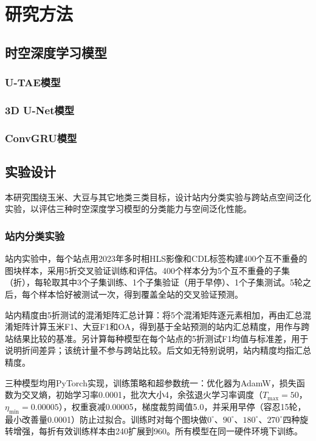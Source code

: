 
\section{研究方法}

\subsection{时空深度学习模型}

\subsubsection{U-TAE模型}


\subsubsection{3D U-Net模型}


\subsubsection{ConvGRU模型}


\subsection{实验设计}

本研究围绕玉米、大豆与其它地类三类目标，设计站内分类实验与跨站点空间泛化实验，以评估三种时空深度学习模型的分类能力与空间泛化性能。

\subsubsection{站内分类实验}

站内实验中，每个站点用2023年多时相HLS影像和CDL标签构建400个互不重叠的图块样本，采用5折交叉验证训练和评估。400个样本分为5个互不重叠的子集（折），每轮取其中3个子集训练、1个子集验证（用于早停）、1个子集测试。5轮之后，每个样本恰好被测试一次，得到覆盖全站的交叉验证预测。

站内精度由5折测试的混淆矩阵汇总计算：将5个混淆矩阵逐元素相加，再由汇总混淆矩阵计算玉米F1、大豆F1和OA，得到基于全站预测的站内汇总精度，用作与跨站结果比较的基准。另计算每种模型在每个站点的5折测试F1均值与标准差，用于说明折间差异；该统计量不参与跨站比较。后文如无特别说明，站内精度均指汇总精度。

三种模型均用PyTorch实现，训练策略和超参数统一：优化器为AdamW，损失函数为交叉熵，初始学习率0.0001，批次大小4，余弦退火学习率调度（$T_{\max}=50$，$\eta_{\min}=0.00005$），权重衰减0.00005，梯度裁剪阈值5.0，并采用早停（容忍15轮，最小改善量0.0001）防止过拟合。训练时对每个图块做$0^{\circ}$、$90^{\circ}$、$180^{\circ}$、$270^{\circ}$四种旋转增强，每折有效训练样本由240扩展到960。所有模型在同一硬件环境下训练。

